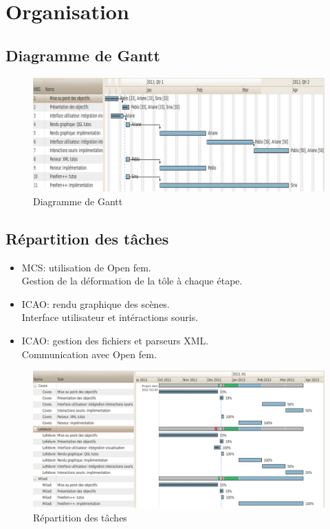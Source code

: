 \documentclass{beamer}
\begin{document}
\section{Organisation}
\subsection{Diagramme de Gantt}
\begin{frame}
    \begin{figure}
        \includegraphics[width=\textwidth]{img/gantt.png}
        \caption{Diagramme de Gantt}
        \label{DiagrammeDeGant}
    \end{figure}
\end{frame}
\subsection{Répartition des tâches}
\begin{frame}
    \begin{itemize}
        \item MCS: utilisation de Open fem.\\
            Gestion de la déformation de la tôle à chaque étape.
        \item ICAO: rendu graphique des scènes.\\
            Interface utilisateur et intéractions souris.
        \item ICAO: gestion des fichiers et parseurs XML.\\
            Communication avec Open fem.
    \end{itemize}
\end{frame}
\begin{frame}
    \begin{figure}
        \includegraphics[width=\textwidth]{img/ganttRepartition.png}
        \caption{Répartition des tâches}
        \label{Répartition}
    \end{figure}
\end{frame}
\end{document}
